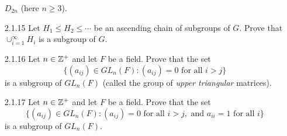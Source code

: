 \begin{enumerate}
                  $D_{2n}$ (here $n \ge 3$).
   \item[2.1.15]  Let $H_1 \le H_2 \le \cdots$ be an ascending chain of
                  subgroups of $G$. Prove that $\cup_{i=1}^\infty H_i$ is a 
                  subgroup of $G$.
   \item[2.1.16]  Let $n \in \mathbb{Z}^+$ and let $F$ be a field. Prove that the set
                  $$\{(a_{ij}) \in GL_n(F) : (a_{ij}) = 0 \text{ for all }
                     i > j\}$$
                  is a subgroup of $GL_n(F)$ (called the group of
                  \textit{upper triangular} matrices).
   \item[2.1.17]  Let $n \in \mathbb{Z}^+$ and let $F$ be a field. Prove that the set
                  $$\{(a_{ij}) \in GL_n(F) : (a_{ij}) = 0 \text{ for all }
                      i > j, \text{ and } a_{ii} = 1 \text{ for all }i\}$$
                  is a subgroup of $GL_n(F)$.
\end{enumerate}
